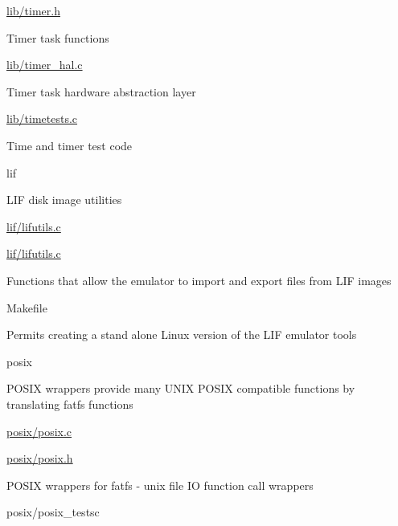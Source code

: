 \begin{DoxyItemize}
\begin{DoxyItemize}
\item \hyperlink{timer_8h}{lib/timer.\+h}
\begin{DoxyItemize}
\item Timer task functions
\end{DoxyItemize}
\item \hyperlink{timer__hal_8c}{lib/timer\+\_\+hal.\+c}
\begin{DoxyItemize}
\item Timer task hardware abstraction layer
\end{DoxyItemize}
\item \hyperlink{timetests_8c}{lib/timetests.\+c}
\begin{DoxyItemize}
\item Time and timer test code
\end{DoxyItemize}
\end{DoxyItemize}
\item lif
\begin{DoxyItemize}
\item L\+IF disk image utilities
\item \hyperlink{lifutils_8c}{lif/lifutils.\+c}
\item \hyperlink{lifutils_8c}{lif/lifutils.\+c}
\begin{DoxyItemize}
\item Functions that allow the emulator to import and export files from L\+IF images
\end{DoxyItemize}
\item Makefile
\begin{DoxyItemize}
\item Permits creating a stand alone Linux version of the L\+IF emulator tools
\end{DoxyItemize}
\end{DoxyItemize}
\item posix
\begin{DoxyItemize}
\item P\+O\+S\+IX wrappers provide many U\+N\+IX P\+O\+S\+IX compatible functions by translating fatfs functions
\item \hyperlink{posix_8c}{posix/posix.\+c}
\item \hyperlink{posix_8h}{posix/posix.\+h}
\begin{DoxyItemize}
\item P\+O\+S\+IX wrappers for fatfs -\/ unix file IO function call wrappers
\end{DoxyItemize}
\item posix/posix\+\_\+testsc
\begin{DoxyItemize}

\end{DoxyItemize}
\end{DoxyItemize}
\end{DoxyItemize}
